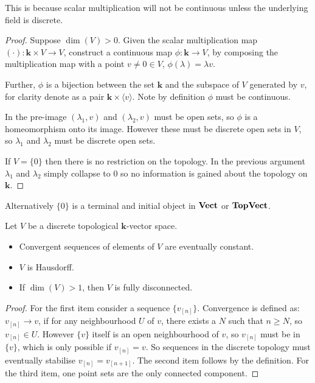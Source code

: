         This is because scalar multiplication will not be continuous unless the underlying field is discrete.
        
        \begin{proof}
        Suppose \( \dim(V) > 0\).
        Given the scalar multiplication map \( (\cdot) : \mathbf{k} \times V \rightarrow V\), construct a continuous map \( \phi : \mathbf{k} \rightarrow V \), by composing the multiplication map with a point \(v \neq 0 \in V\), \( \phi(\lambda) = \lambda v  \). 
        
        Further, \(\phi \) is a bijection between the set \(\mathbf{k}\) and the subspace of \(V\) generated by \(v\), for clarity denote as a pair \( \mathbf{k} \times \langle v\rangle \). Note by definition \( \phi\) must be continuous. 
        
        
        In the pre-image \( (\lambda_1, v)\) and \((\lambda_2, v)\) must be open sets, so \( \phi\) is a homeomorphism onto its image. However these must be discrete open sets in \(V\), so \( \lambda_1 \) and \( \lambda_2\) must be discrete open sets.
        
        If \( V = \{ 0\} \) then there is no restriction on the topology. In the previous argument \( \lambda_1 \) and \( \lambda_2\) simply collapse to \(0\) so no information is gained about the topology on \( \mathbf{k}\).
        \end{proof}
        
        
        
        Alternatively \( \{0\}\) is a terminal and initial object in \( \mathbf{Vect}\) or \( \mathbf{TopVect}\). 

        \begin{lem} 
        Let \(V\) be a  discrete topological \( \mathbf{k}\)-vector space. 
        \begin{itemize}
            \item Convergent sequences of elements of \(V\) are eventually constant. 
            \item \(V\) is Hausdorff.
            \item If \( \dim(V) > 1\), then \(V\) is fully disconnected.
        \end{itemize}
        \end{lem}
        
        \begin{proof}
        For the first item consider a sequence \( \{v_{[n]}\}\).  Convergence is defined as: \(v_{[n]} \rightarrow v\), if for any neighbourhood \(U\) of \(v\), there exists a \( N\) such that \( n \geq N\), so \(v_{[n]} \in U\). However \(\{v\}\) itself is an open neighbourhood of \(v\), so \( v_{[n]}\) must be in \(\{ v\}\), which is only possible if \( v_{[n]} = v\). So sequences in the discrete topology must eventually stabilise \(v_{[n]} = v_{[n+1]}\). The second item follows by the definition. For the third item, one point sets are the only connected component.
        \end{proof}
    
